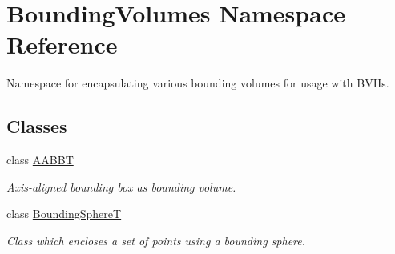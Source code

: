 \hypertarget{namespaceBoundingVolumes}{}\section{Bounding\+Volumes Namespace Reference}
\label{namespaceBoundingVolumes}


Namespace for encapsulating various bounding volumes for usage with B\+V\+Hs.  


\subsection*{Classes}
\begin{DoxyCompactItemize}
\item 
class \hyperlink{classBoundingVolumes_1_1AABBT}{A\+A\+B\+BT}
\begin{DoxyCompactList}\small\item\em Axis-\/aligned bounding box as bounding volume. \end{DoxyCompactList}\item 
class \hyperlink{classBoundingVolumes_1_1BoundingSphereT}{Bounding\+SphereT}
\begin{DoxyCompactList}\small\item\em Class which encloses a set of points using a bounding sphere. \end{DoxyCompactList}\end{DoxyCompactItemize}
